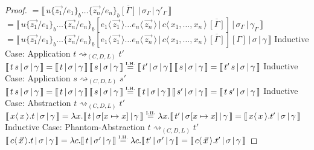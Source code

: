 \documentclass[a4paper,UKenglish,cleveref, autoref]{lipics-v2019}
\newcommand{\abs}[2]{\lambda #1 . #2}
\newcommand{\app}[2]{#1 \, #2}
\newcommand{\fake}[3]{#1 \langle \, #2 \, \rangle . #3}
\newcommand{\dist}[5]{#1 [ #2 \, \vert \, \fakedist{#4}{#5} \, #3 ]}
\newcommand{\fakedist}[2]{#1 \langle \, #2 \, \rangle}
\newcommand{\psub}[3]{#1 \{ #2 / #3 \}_{b}}
\newcommand{\readbackwmap}[3]{\llbracket \, #1 \, \vert \, #2 \, \vert \, #3  \, \rrbracket }
\newcommand{\IH}{\stackrel{\hbox{\tiny I.H.}}{\hbox{=}}}
\begin{document}
\begin{proof}
\newline
$ =  \readbackwmap{u \psub{}{\vec{z_{1}}}{e_{1}} \dots \psub{}{\vec{z_{n}}}{e_{n}} \overline{[\Gamma]}}{\sigma_{\Gamma}}{\gamma'_{\Gamma}}$
\newline
$= \readbackwmap{\dist{u \psub{}{\vec{z_{1}}}{e_{1}} \dots \psub{}{\vec{z_{n}}}{e_{n}} }{\fakedist{e_{1}}{\vec{z_{1}}} \dots \fakedist{e_{n}}{\vec{z_{n}}}}{\overline{[\Gamma]}}{c}{x_{1}, \dots, x_{n}}}{\sigma_{\Gamma}}{\gamma_{\Gamma}}$
\newline
$= \readbackwmap{\dist{u \psub{}{\vec{z_{1}}}{e_{1}} \dots \psub{}{\vec{z_{n}}}{e_{n}} }{\fakedist{e_{1}}{\vec{z_{1}}} \dots \fakedist{e_{n}}{\vec{z_{n}}}}{\overline{[\Gamma]}}{c}{x_{1}, \dots, x_{n}} [\Gamma]}{\sigma}{\gamma}$
\newline
\newline
Inductive Case: Application $t \rightsquigarrow_{(C, D, L)} t'$
\newline
$\readbackwmap{\app{t}{s}}{\sigma}{\gamma} = \app{\readbackwmap{t}{\sigma}{\gamma}}{\readbackwmap{s}{\sigma}{\gamma}} \IH \app{\readbackwmap{t'}{\sigma}{\gamma}}{\readbackwmap{s}{\sigma}{\gamma}} = \readbackwmap{\app{t'}{s}}{\sigma}{\gamma}$
\newline
\newline
Inductive Case: Application $s \rightsquigarrow_{(C, D, L)} s'$
\newline
$\readbackwmap{\app{t}{s}}{\sigma}{\gamma} = \app{\readbackwmap{t}{\sigma}{\gamma}}{\readbackwmap{s}{\sigma}{\gamma}} \IH \app{\readbackwmap{t}{\sigma}{\gamma}}{\readbackwmap{s'}{\sigma}{\gamma}} = \readbackwmap{\app{t}{s'}}{\sigma}{\gamma}$
\newline
\newline
Inductive Case: Abstraction $t \rightsquigarrow_{(C, D, L)} t'$
\newline
$\readbackwmap{\fake{x}{x}{t}}{\sigma}{\gamma} = \abs{x}{\readbackwmap{t}{\sigma[x \mapsto x]}{\gamma}} \IH \abs{x}{\readbackwmap{t'}{\sigma[x \mapsto x]}{\gamma}} = \readbackwmap{\fake{x}{x}{t'}}{\sigma}{\gamma}$
\newline
\newline
Inductive Case: Phantom-Abstraction $t \rightsquigarrow_{(C, D, L)} t'$
\newline
$\readbackwmap{\fake{c}{\vec{x}}{t}}{\sigma}{\gamma} = \abs{c}{\readbackwmap{t}{\sigma'}{\gamma}} \IH \abs{c}{\readbackwmap{t'}{\sigma'}{\gamma}} = \readbackwmap{\fake{c}{\vec{x}}{t'}}{\sigma}{\gamma}$
\newline
\newline

\end{proof}
\end{document}
